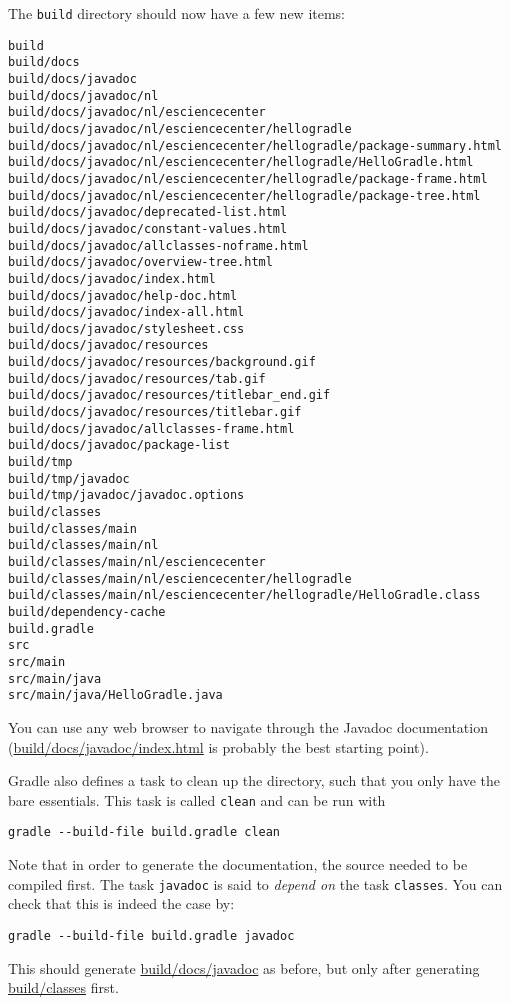 The \texttt{build} directory should now have a few new items:
\begin{lstlisting}[style=basic,style=bash]
build
build/docs
build/docs/javadoc
build/docs/javadoc/nl
build/docs/javadoc/nl/esciencecenter
build/docs/javadoc/nl/esciencecenter/hellogradle
build/docs/javadoc/nl/esciencecenter/hellogradle/package-summary.html
build/docs/javadoc/nl/esciencecenter/hellogradle/HelloGradle.html
build/docs/javadoc/nl/esciencecenter/hellogradle/package-frame.html
build/docs/javadoc/nl/esciencecenter/hellogradle/package-tree.html
build/docs/javadoc/deprecated-list.html
build/docs/javadoc/constant-values.html
build/docs/javadoc/allclasses-noframe.html
build/docs/javadoc/overview-tree.html
build/docs/javadoc/index.html
build/docs/javadoc/help-doc.html
build/docs/javadoc/index-all.html
build/docs/javadoc/stylesheet.css
build/docs/javadoc/resources
build/docs/javadoc/resources/background.gif
build/docs/javadoc/resources/tab.gif
build/docs/javadoc/resources/titlebar_end.gif
build/docs/javadoc/resources/titlebar.gif
build/docs/javadoc/allclasses-frame.html
build/docs/javadoc/package-list
build/tmp
build/tmp/javadoc
build/tmp/javadoc/javadoc.options
build/classes
build/classes/main
build/classes/main/nl
build/classes/main/nl/esciencecenter
build/classes/main/nl/esciencecenter/hellogradle
build/classes/main/nl/esciencecenter/hellogradle/HelloGradle.class
build/dependency-cache
build.gradle
src
src/main
src/main/java
src/main/java/HelloGradle.java
\end{lstlisting}

You can use any web browser to navigate through the Javadoc documentation (\url{build/docs/javadoc/index.html} is probably the best starting point).

Gradle also defines a task to clean up the directory, such that you only have the bare essentials. This task is called \texttt{clean} and can be run with
\begin{lstlisting}[style=basic,style=bash]
gradle --build-file build.gradle clean
\end{lstlisting}


Note that in order to generate the documentation, the source needed to be compiled first. The task \texttt{javadoc} is said to \textit{depend on} the task \texttt{classes}. You can check that this is indeed the case by:
\begin{lstlisting}[style=basic,style=bash]
gradle --build-file build.gradle javadoc
\end{lstlisting}
This should generate \url{build/docs/javadoc} as before, but only after generating \url{build/classes} first.


